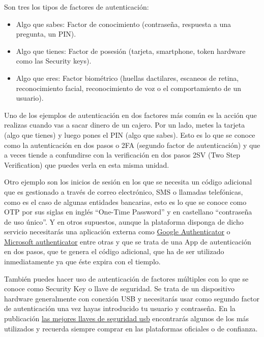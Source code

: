 \documentclass[
  spanish,
  a4paper,
  openany]{book}
\begin{document}
Son tres los tipos de factores de autenticación:

\begin{itemize}
\item
  Algo que sabes: Factor de conocimiento (contraseña, respuesta a una pregunta, un PIN).
\item
  Algo que tienes: Factor de posesión (tarjeta, smartphone, token hardware como las Security keys).
\item
  Algo que eres: Factor biométrico (huellas dactilares, escaneos de retina, reconocimiento facial, reconocimiento de voz o el comportamiento de un usuario).
\end{itemize}

Uno de los ejemplos de autenticación en dos factores más común es la acción que realizas cuando vas a sacar dinero de un cajero. Por un lado, metes la tarjeta (algo que tienes) y luego pones el PIN (algo que sabes). Esto es lo que se conoce como la autenticación en dos pasos o 2FA (segundo factor de autenticación) y que a veces tiende a confundirse con la verificación en dos pasos 2SV (Two Step Verification) que puedes verla en esta misma unidad.

Otro ejemplo son los inicios de sesión en los que se necesita un código adicional que es gestionado a través de correo electrónico, SMS o llamadas telefónicas, como es el caso de algunas entidades bancarias, esto es lo que se conoce como OTP por sus siglas en inglés ``One-Time Password'' y en castellano ``contraseña de uso único''. Y en otros supuestos, aunque la plataforma disponga de dicho servicio necesitarás una aplicación externa como \href{https://support.google.com/accounts/answer/1066447?co=GENIE.Platform\%3DAndroid\&hl=es-419}{Google Authenticator} o \href{https://www.microsoft.com/es-es/account/authenticator}{Microsoft authenticator} entre otras y que se trata de una App de autenticación en dos pasos, que te genera el código adicional, que ha de ser utilizado inmediatamente ya que éste expira con el tiemplo.

También puedes hacer uso de autenticación de factores múltiples con lo que se conoce como Security Key o llave de seguridad. Se trata de un dispositivo hardware generalmente con conexión USB y necesitarás usar como segundo factor de autenticación una vez hayas introducido tu usuario y contraseña. En la publicación \href{https://es.digitaltrends.com/computadoras/las-mejores-llaves-de-seguridad-usb/}{las mejores llaves de seguridad usb} encontrarás algunos de los más utilizados y recuerda siempre comprar en las plataformas oficiales o de confianza.
\end{document}
